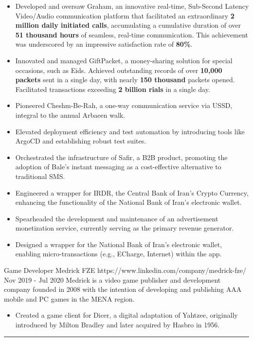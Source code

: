 \documentclass[a4paper,20pt]{article}
\begin{document}
\begin{minipage}[t]{0.65\textwidth}
{    \begin{itemize}[leftmargin=.5cm]
      \item \justifying\small Developed and oversaw Graham, an innovative real-time, Sub-Second Latency Video/Audio communication platform that facilitated an extraordinary \textbf{2 million daily initiated calls}, accumulating a cumulative duration of over \textbf{51 thousand hours} of seamless, real-time communication. This achievement was underscored by an impressive satisfaction rate of \textbf{80\%}.
      \item \justifying\small Innovated and managed GiftPacket, a money-sharing solution for special occasions, such as Eids. Achieved outstanding records of over \textbf{10,000 packets} sent in a single day, with nearly \textbf{150 thousand} packets opened. Facilitated transactions exceeding \textbf{2 billion rials} in a single day.
      \item \justifying\small Pioneered Cheshm-Be-Rah, a one-way communication service via USSD, integral to the annual Arbaeen walk.
      \item \justifying\small Elevated deployment efficiency and test automation by introducing tools like ArgoCD and establishing robust test suites.
      \item \justifying\small Orchestrated the infrastructure of Safir, a B2B product, promoting the adoption of Bale's instant messaging as a cost-effective alternative to traditional SMS.
      \item \justifying\small Engineered a wrapper for IRDR, the Central Bank of Iran's Crypto Currency, enhancing the functionality of the National Bank of Iran's electronic wallet.
      \item \justifying\small Spearheaded the development and maintenance of an advertisement monetization service, currently serving as the primary revenue generator.
      \item \justifying\small Designed a wrapper for the National Bank of Iran's electronic wallet, enabling micro-transactions (e.g., ECharge, Internet) within the app.
  \end{itemize}

  \expheadingwithlink
    {Game Developer}
    {Medrick FZE}
    {https://www.linkedin.com/company/medrick-fze/}
    {Nov 2019 - Jul 2020}
    {Medrick is a video game publisher and development company founded in 2008 with the intention of developing and publishing AAA mobile and PC games in the MENA region.}

    \begin{itemize}[leftmargin=.5cm]
      \item \justifying\small Created a game client for Dicer, a digital adaptation of Yahtzee, originally introduced by Milton Bradley and later acquired by Hasbro in 1956.
    \end{itemize}
  }
\end{minipage}

\vspace{-1pt}
\rule{\textwidth}{1pt}
\end{document}
